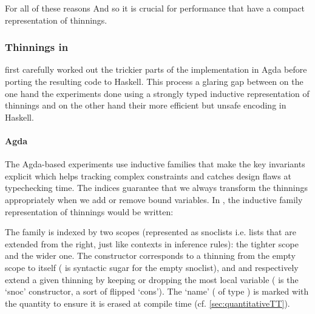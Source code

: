 For all of these reasons
\iftoggle{BLIND}
{the \typos~\cite{MANUAL:talk/types/Allais22} authors have, as we mentioned earlier,
opted for a co-de Bruijn representation.

}{
we have, as we mentioned earlier, opted for a co-de Bruijn
representation in the implementation of \typos~\cite{MANUAL:talk/types/Allais22}.
}
%
And so it is crucial for performance that
\iftoggle{BLIND}{they}{we} have a compact representation of thinnings.
%

\subsubsection{Thinnings in \typos}

\iftoggle{BLIND}{The authors}{We}
first carefully worked out the trickier parts of the implementation in Agda before
porting the resulting code to Haskell.
%
This process \iftoggle{BLIND}{highlights}{highlighted}
a glaring gap between on the one hand the experiments done
using a strongly typed inductive representation of thinnings and on the other hand
their more efficient but unsafe encoding in Haskell.

\paragraph{Agda}
The Agda-based experiments use inductive families that make the key invariants
explicit which helps tracking complex constraints and catches design flaws at
typechecking time.
%
The indices guarantee that we always transform the thinnings appropriately when
we add or remove bound variables. In \idris{}, the inductive family representation
of thinnings would be written:

%
The  family is indexed by two scopes (represented as snoclists
i.e. lists that are extended from the right, just like contexts in inference rules):
 the tighter scope and  the wider one.
%
The  constructor corresponds to a thinning from the empty scope to
itself (\IdrisData{[<]} is \idris{} syntactic sugar for the empty snoclist),
and  and  respectively extend a given thinning
by keeping or dropping the most local variable (\IdrisData{:<} is the `snoc'
constructor, a sort of flipped `cons').
%
The `name' ( of type ) is marked with the quantity
 to ensure it is erased at compile time (cf. \cref{sec:quantitativeTT}).

